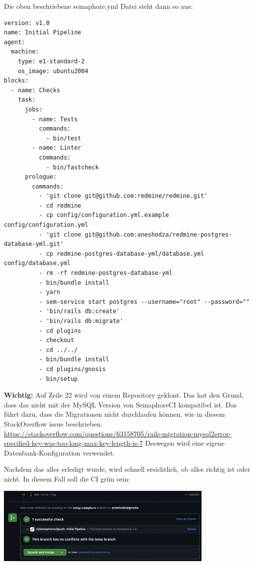 \begin{minipage}{\textwidth}
  Die oben beschriebene semaphore.yml Datei sieht dann so aus:
  \begin{codebox}[]
    \begin{verbatim}
version: v1.0
name: Initial Pipeline
agent:
  machine:
    type: e1-standard-2
    os_image: ubuntu2004
blocks:
  - name: Checks
    task:
      jobs:
        - name: Tests
          commands:
            - bin/test
        - name: Linter
          commands:
            - bin/fastcheck
      prologue:
        commands:
          - 'git clone git@github.com:redmine/redmine.git'
          - cd redmine
          - cp config/configuration.yml.example config/configuration.yml
          - 'git clone git@github.com:aneshodza/redmine-postgres-database-yml.git'
          - cp redmine-postgres-database-yml/database.yml config/database.yml
          - rm -rf redmine-postgres-database-yml
          - bin/bundle install
          - yarn
          - sem-service start postgres --username="root" --password=""
          - 'bin/rails db:create'
          - 'bin/rails db:migrate'
          - cd plugins
          - checkout
          - cd ../../
          - bin/bundle install
          - cd plugins/gnosis
          - bin/setup
    \end{verbatim}
  \end{codebox}
  \textbf{Wichtig:} Auf Zeile 22 wird von einem Repository geklont. Das hat den Grund, dass das
   nicht mit der MySQL Version von SemaphoreCI kompatibel ist. Das führt dazu,
  dass die Migrationen nicht durchlaufen können, wie in diesem StackOverflow issue beschrieben: \newline
  \url{https://stackoverflow.com/questions/63158705/rails-migration-mysql2error-specified-key-was-too-long-max-key-length-is-7}
  \newline
  Deswegen wird eine eigene Datenbank-Konfiguration verwendet.
\end{minipage}

\begin{minipage}{\textwidth}
  Nachdem das alles erledigt wurde, wird schnell ersichtlich, ob alles richtig ist oder nicht. In diesem Fall soll die CI
  grün sein: \newline
  \begin{center}
    \includegraphics[width=0.8\textwidth]{images/misc/ci-passed.png}
    \label{fig:semaphore_ci_passed}
    \newline
  \end{center}
\end{minipage}


